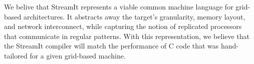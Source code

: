 \documentclass{sig-alternate}
\begin{document}
We belive that StreamIt represents a viable common machine language
for grid-based architectures.  It abstracts away the target's
granularity, memory layout, and network interconnect, while capturing
the notion of replicated processors that communicate in regular
patterns.  With this representation, we believe that the StreamIt
compiler will match the performance of C code that was hand-tailored
for a given grid-based machine.


\begin{small}


\end{small}
\end{document}
